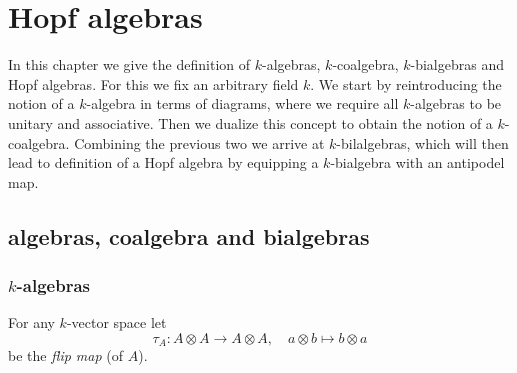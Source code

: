 \chapter{Hopf algebras}
In this chapter we give the definition of $k$-algebras, $k$-coalgebra, $k$-bialgebras and Hopf algebras. For this we fix an arbitrary field $k$. We start by reintroducing the notion of a $k$-algebra in terms of diagrams, where we require all $k$-algebras to be unitary and associative. Then we dualize this concept to obtain the notion of a $k$-coalgebra. Combining the previous two we arrive at $k$-bilalgebras, which will then lead to definition of a Hopf algebra by equipping a $k$-bialgebra with an antipodel map.







\section{algebras, coalgebra and bialgebras}





\subsection{\texorpdfstring{$k$}{k}-algebras}


\begin{defi}
 For any $k$-vector space let
 \[
  \tau_A \colon A \otimes A \to A \otimes A, \quad a \otimes b \mapsto b \otimes a
 \]
 be the \emph{flip map} (of $A$).
\end{defi}



